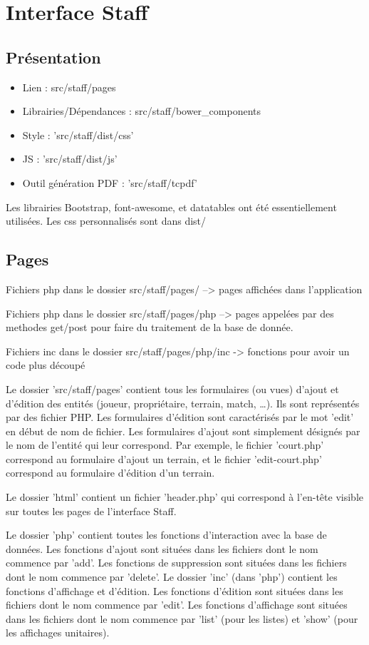 \documentclass{article}
\begin{document}
\section{Interface Staff}

\subsection{Présentation}

\begin{itemize}
\item Lien : src/staff/pages
\item Librairies/Dépendances : src/staff/bower\_components
\item Style : 'src/staff/dist/css'
\item JS : 'src/staff/dist/js'
\item Outil génération PDF : 'src/staff/tcpdf'
\end{itemize}

Les librairies Bootstrap, font-awesome, et datatables ont été essentiellement utilisées.
Les css personnalisés sont dans dist/

\subsection{Pages}

Fichiers php dans le dossier src/staff/pages/ –> pages affichées dans l'application

Fichiers php dans le dossier src/staff/pages/php –> pages appelées par des methodes get/post pour faire du traitement de la base de donnée.

Fichiers inc dans le dossier src/staff/pages/php/inc -> fonctions pour avoir un code plus découpé

Le dossier 'src/staff/pages' contient tous les formulaires (ou vues) d'ajout et d'édition des entités (joueur, propriétaire, terrain, match, …). Ils sont représentés par des fichier PHP. Les formulaires d'édition sont caractérisés par le mot 'edit' en début de nom de fichier. Les formulaires d'ajout sont simplement désignés par le nom de l'entité qui leur correspond. Par exemple, le fichier 'court.php' correspond au formulaire d'ajout un terrain, et le fichier 'edit-court.php' correspond au formulaire d'édition d'un terrain.

Le dossier 'html' contient un fichier 'header.php' qui correspond à l'en-tête visible sur toutes les pages de l'interface Staff.

Le dossier 'php' contient toutes les fonctions d'interaction avec la base de données. Les fonctions d'ajout sont situées dans les fichiers dont le nom commence par 'add'. Les fonctions de suppression sont situées dans les fichiers dont le nom commence par 'delete'.
Le dossier 'inc' (dans 'php') contient les fonctions d'affichage et d'édition. Les fonctions d'édition sont situées dans les fichiers dont le nom commence par 'edit'. Les fonctions d'affichage sont situées dans les fichiers dont le nom commence par 'list' (pour les listes) et 'show' (pour les affichages unitaires).
\end{document}
